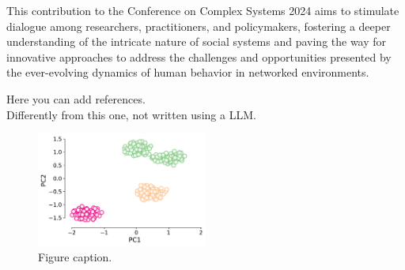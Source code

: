 \documentclass[11pt]{article}
\begin{document}
This contribution to the Conference on Complex Systems 2024 aims to stimulate dialogue among researchers, practitioners, and policymakers, fostering a deeper understanding of the intricate nature of social systems and paving the way for innovative approaches to address the challenges and opportunities presented by the ever-evolving dynamics of human behavior in networked environments.

\bigskip
{\small
\noindent[1] Here you can add references.\\
\noindent[2] Differently from this one, not written using a LLM.
}

\begin{figure}[b]
  \centering
  \includegraphics[width=0.5\textwidth]{figure.pdf}
  \caption{Figure caption.}
\end{figure}
\end{document}
